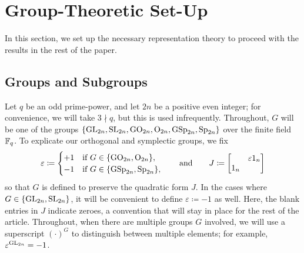 
\section{Group-Theoretic Set-Up} \label{sec:rep-theory}
In this section, we set up the necessary representation theory to proceed with the results in the rest of the paper.

\subsection{Groups and Subgroups}
Let $q$ be an odd prime-power, and let $2n$ be a positive even integer; for convenience, we will take $3\nmid q$, but this is used infrequently. Throughout, $G$ will be one of the groups $\{{\mathrm{GL}}_{2n},{\mathrm{SL}}_{2n},\mathrm{GO}_{2n},\mathrm{O}_{2n},\mathrm{GSp}_{2n},\mathrm{Sp}_{2n}\}$ over the finite field $\mathbb F_q$. To explicate our orthogonal and symplectic groups, we fix
\[\varepsilon\coloneqq\begin{cases}
    +1 & \text{if }G\in\{\mathrm{GO}_{2n},\mathrm{O}_{2n}\}, \\
    -1 & \text{if }G\in\{\mathrm{GSp}_{2n},\mathrm{Sp}_{2n}\},
\end{cases}\qquad\text{and}\qquad J\coloneqq\begin{bmatrix}
    & \varepsilon1_n \\
    1_n
\end{bmatrix}\]
so that $G$ is defined to preserve the quadratic form $J$. In the cases where $G\in\{\mathrm{GL}_{2n},\mathrm{SL}_{2n}\}$, it will be convenient to define $\varepsilon\coloneqq-1$ as well. Here, the blank entries in $J$ indicate zeroes, a convention that will stay in place for the rest of the article. Throughout, when there are multiple groups $G$ involved, we will use a superscript $(\cdot)^G$ to distinguish between multiple elements; for example, $\varepsilon^{\mathrm{GL}_{2n}}=-1$.

